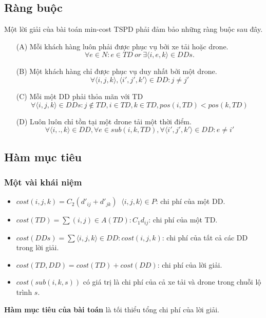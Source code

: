 \documentclass[a4paper,12pt]{report}
\begin{document}
\subsection{Ràng buộc}
Một lời giải của bài toán min-cost \ac{TSPD} phải đảm bảo những ràng buộc sau đây.
\begin{itemize}
\item[(A)]  Mỗi khách hàng luôn phải được phục vụ bởi xe tải hoặc drone. 
\begin{equation} \label{eqn:A}
\forall e \in N: e \in TD \ or \ \exists \langle i,e,k \rangle \in DDs.
\end{equation}
\item[(B)]Một khách hàng chỉ được phục vụ duy nhất bởi một drone.
\begin{equation}\label{eqn:B}
\forall \langle i,j,k\rangle,\langle i',j',k'\rangle \in DD: j \neq j'
\end{equation}
\item[(C)] Mỗi một DD phải thỏa mãn với TD
\begin{equation}\label{eqn:C}
\forall \langle i,j,k \rangle \in DDs:j \not \in TD,i \in TD,k \in TD,pos(i,TD)<pos(k,TD)
\end{equation}
\item[(D)] Luôn luôn chỉ tồn tại một drone tải một thời điểm.
\begin{equation}\label{eqn:D}
\forall \langle i,.,k \rangle \in DD, \forall e \in sub(i,k,TD), \forall \langle i',j',k'\rangle \in DD: e \neq i'
\end{equation}
\end{itemize}
\subsection{Hàm mục tiêu}
\subsubsection{Một vài khái niệm}
\begin{itemize}
\item $cost(i,j,k)=C_2(d'_{ij}+d'_{jk}) \ $ $\langle i,j,k \rangle \in P$: chi phí của một \ac{DD}.
\item $cost(TD)=\sum(i,j) \in A(TD): C_1d_{ij}$: chi phí của một \ac{TD}.
\item $cost(DDs)=\sum \langle i,j,k \rangle \in DD: cost(i,j,k)$: chi phí của tất cả các \ac{DD} trong lời giải.
\item $cost(TD,DD)=cost(TD)+cost(DD)$: chi phí của lời giải.
\item $cost(sub(i,k,s))$ có giá trị là chi phí của cả xe tải và drone trong chuỗi lộ trình $s$.
\end{itemize}
\textbf{Hàm mục tiêu của bài toán} là tối thiểu tổng chi phí của lời giải.
\end{document}
